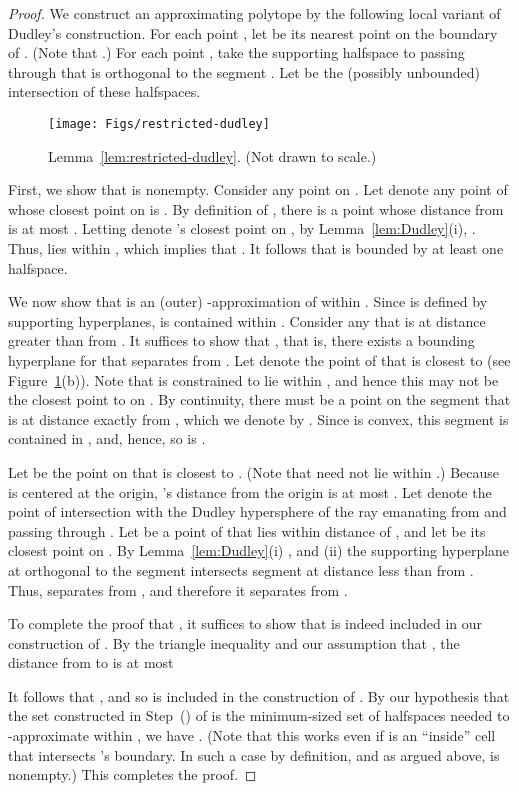 \documentclass[11pt]{article}   \usepackage[letterpaper,hmargin=2.1cm,vmargin=3cm]{geometry}
\begin{document}
\begin{proof}
We construct an approximating polytope  by the following local variant of Dudley's construction. For each point , let  be its nearest point on the boundary of . (Note that .) For each point , take the supporting halfspace to  passing through  that is orthogonal to the segment . Let  be the (possibly unbounded) intersection of these halfspaces.

\begin{figure}[htbp]
  \centerline{\texttt{[image: Figs/restricted-dudley]}}
  \caption{Lemma~\ref{lem:restricted-dudley}. (Not drawn to scale.)}
  \label{fig:restricted-dudley}
\end{figure}


First, we show that  is nonempty. Consider any point  on . Let  denote any point of  whose closest point on  is . By definition of , there is a point  whose distance from  is at most . Letting  denote 's closest point on , by Lemma~\ref{lem:Dudley}(i), . Thus,  lies within , which implies that . It follows that  is bounded by at least one halfspace.


We now show that  is an (outer) -approximation of  within . Since  is defined by supporting hyperplanes,  is contained within . Consider any  that is at distance greater than  from . It suffices to show that , that is, there exists a bounding hyperplane for  that separates  from . Let  denote the point of  that is closest to  (see Figure~\ref{fig:restricted-dudley}(b)). Note that  is constrained to lie within , and hence this may not be the closest point to  on . By continuity, there must be a point on the segment  that is at distance exactly  from , which we denote by . Since  is convex, this segment is contained in , and, hence, so is . 

Let  be the point on  that is closest to . (Note that  need not lie within .) Because  is centered at the origin, 's distance from the origin is at most . Let  denote the point of intersection with the Dudley hypersphere  of the ray emanating from  and passing through . Let  be a point of  that lies within distance  of , and let  be its closest point on . By Lemma~\ref{lem:Dudley}(i) , and (ii) the supporting hyperplane  at  orthogonal to the segment  intersects segment  at distance less than  from . Thus,  separates  from , and therefore it separates  from .

To complete the proof that , it suffices to show that  is indeed included in our construction of . By the triangle inequality and our assumption that , the distance from  to  is at most

It follows that , and so  is included in the construction of . By our hypothesis that the set  constructed in Step~(\stepapx) of  is the minimum-sized set of halfspaces needed to -approximate  within , we have . (Note that this works even if  is an ``inside'' cell that intersects 's boundary. In such a case  by definition, and as argued above,  is nonempty.) This completes the proof.
\end{proof}
\end{document}

